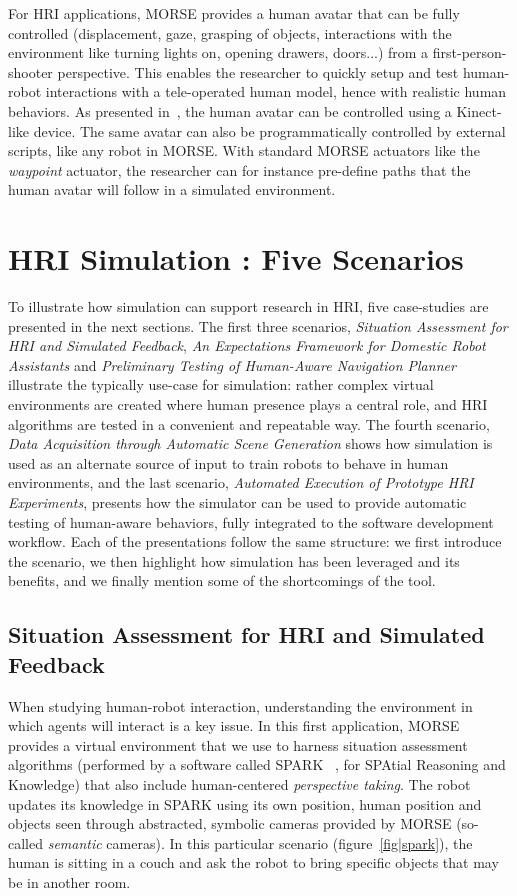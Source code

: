 \documentclass[conference]{IEEEtran}
\begin{document}
For HRI applications, MORSE provides a human avatar that can be fully controlled
(displacement, gaze, grasping of objects, interactions with the environment like
turning lights on, opening drawers, doors...) from a first-person-shooter perspective.
This enables the researcher to quickly setup and test human-robot interactions
with a tele-operated human model, hence with realistic human behaviors. As
presented in~\cite{lemaignan2012morse}, the human avatar can be controlled using
a Kinect-like device. The same avatar can also be programmatically controlled
by external scripts, like any robot in MORSE. With standard MORSE actuators like
the \emph{waypoint} actuator, the researcher can for instance pre-define paths
that the human avatar will follow in a simulated environment.

\section{HRI Simulation : Five Scenarios}

To illustrate how simulation can support research in HRI, five case-studies are
presented in the next sections. The first three scenarios, \emph{Situation
Assessment for HRI and Simulated Feedback}, \emph{An Expectations Framework for
Domestic Robot Assistants} and \emph{Preliminary Testing of Human-Aware
Navigation Planner} illustrate the typically use-case for simulation: rather
complex virtual environments are created where human presence plays a
central role, and HRI algorithms are tested in a convenient and repeatable way.
The fourth scenario, \emph{Data Acquisition through Automatic Scene Generation}
shows how simulation is used as an alternate source of input to train robots to
behave in human environments, and the last scenario, \emph{Automated Execution
of Prototype HRI Experiments}, presents how the simulator can be used to provide
automatic testing of human-aware behaviors, fully integrated to the software
development workflow. Each of the presentations follow the same structure: we
first introduce the scenario, we then highlight how simulation has been leveraged
and its benefits, and we finally mention some of the shortcomings of the tool.

\subsection{Situation Assessment for HRI and Simulated Feedback}
\label{sc:assessment}

When studying human-robot interaction, understanding the environment in which
agents will interact is a key issue. In this first application, MORSE provides a
virtual environment that we use to harness situation assessment algorithms
(performed by a software called SPARK ~\cite{Warnier2012a}, for SPAtial Reasoning and Knowledge) that
also include human-centered \emph{perspective taking}. The robot updates its
knowledge in SPARK using its own position, human position and objects seen
through abstracted, symbolic cameras provided by MORSE (so-called
\emph{semantic} cameras). In this particular scenario (figure~\ref{fig|spark}),
the human is sitting in a couch and ask the robot to bring specific objects that
may be in another room.
\end{document}
